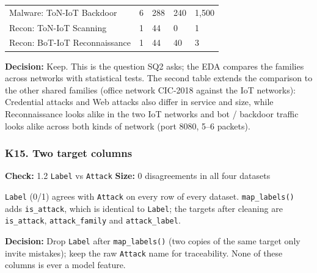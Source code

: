 \documentclass[10pt,a4paper]{article}
\newcommand{\meta}[2]{{\small\color{muted}\textbf{Check:} #1 \quad\textbar\quad \textbf{Size:} #2}}
\newcommand{\decision}[1]{\textcolor{accent}{\textbf{Decision:}} #1\par}
\newenvironment{problem}{\par\noindent\begin{minipage}{\linewidth}\setlength{\parskip}{4pt}}{\end{minipage}\par\bigskip}
\begin{document}
\begin{problem}
\begin{center}
{\begin{tabular}{lllll}
Malware: ToN-IoT Backdoor & 6 & 288 & 240 & 1,500 \\
Recon: ToN-IoT Scanning & 1 & 44 & 0 & 1 \\
Recon: BoT-IoT Reconnaissance & 1 & 44 & 40 & 3 \\
\bottomrule
\end{tabular}}\end{center}
\decision{Keep. This is the question SQ2 asks; the EDA compares the families across networks with statistical tests. The second table extends the comparison to the other shared families (office network CIC-2018 against the IoT networks): Credential attacks and Web attacks also differ in service and size, while Reconnaissance looks alike in the two IoT networks and bot / backdoor traffic looks alike across both kinds of network (port 8080, 5--6 packets).}
\end{problem}

\begin{problem}
\subsubsection*{K15. Two target columns}
\meta{1.2 \texttt{Label} vs \texttt{Attack}}{0 disagreements in all four datasets}

\texttt{Label} (0/1) agrees with \texttt{Attack} on every row of every dataset. \texttt{map\_\allowbreak{}labels()} adds \texttt{is\_\allowbreak{}attack}, which is identical to \texttt{Label}; the targets after cleaning are \texttt{is\_\allowbreak{}attack}, \texttt{attack\_\allowbreak{}family} and \texttt{attack\_\allowbreak{}label}.

\decision{Drop \texttt{Label} after \texttt{map\_\allowbreak{}labels()} (two copies of the same target only invite mistakes); keep the raw \texttt{Attack} name for traceability. None of these columns is ever a model feature.}
\end{problem}
\end{document}
